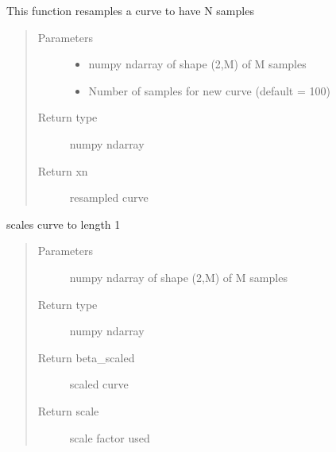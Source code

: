 \documentclass[letterpaper,10pt,english]{sphinxmanual}
\begin{document}

\begin{fulllineitems}
\label{\detokenize{curve_functions:curve_functions.resamplecurve}}
This function resamples a curve to have N samples
\begin{quote}\begin{description}
\item[{Parameters}] \leavevmode\begin{itemize}
\item {} 
 \textendash{} numpy ndarray of shape (2,M) of M samples

\item {} 
 \textendash{} Number of samples for new curve (default = 100)

\end{itemize}

\item[{Return type}] \leavevmode
numpy ndarray

\item[{Return xn}] \leavevmode
resampled curve

\end{description}\end{quote}

\end{fulllineitems}


\begin{fulllineitems}
\label{\detokenize{curve_functions:curve_functions.scale_curve}}
scales curve to length 1
\begin{quote}\begin{description}
\item[{Parameters}] \leavevmode
{} \textendash{} numpy ndarray of shape (2,M) of M samples

\item[{Return type}] \leavevmode
numpy ndarray

\item[{Return beta\_scaled}] \leavevmode
scaled curve

\item[{Return scale}] \leavevmode
scale factor used

\end{description}\end{quote}

\end{fulllineitems}
\end{document}
